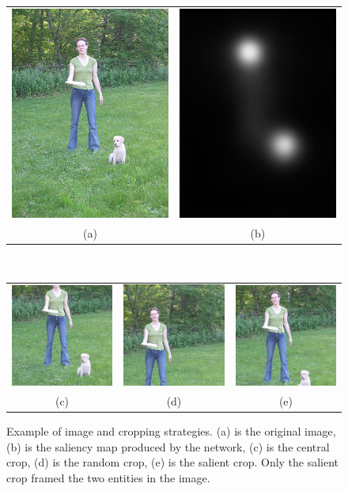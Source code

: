 \documentclass[English]{style/ic-tese-v3}
\begin{document}
\begin{figure}
\scriptsize
\begin{center}
    \begin{tabular} {cc}
    \includegraphics[width=0.25\linewidth]{./img/crops/6-raw.JPEG} &
    \includegraphics[width=0.25\linewidth]{./img/crops/6-sals.png} \\
    (a) & (b) \\
    \end{tabular}\\
    \begin{tabular} {ccc}
    \includegraphics[width=0.2\linewidth]{./img/crops/6-central.JPEG} &
    \includegraphics[width=0.2\linewidth]{./img/crops/6-rand.JPEG} &
    \includegraphics[width=0.2\linewidth]{./img/crops/6-soft.JPEG} \\
    (c) & (d) & (e)\\
    \end{tabular}
\caption{\small Example of image and cropping strategies.
    (a) is the original image, (b) is the saliency map produced by the network,
    (c) is the central crop, (d) is the random crop, (e) is the salient crop.
    Only the salient crop framed the two entities in the image.}
\label{fig:exp2}
\end{center}
\end{figure}
\end{document}
